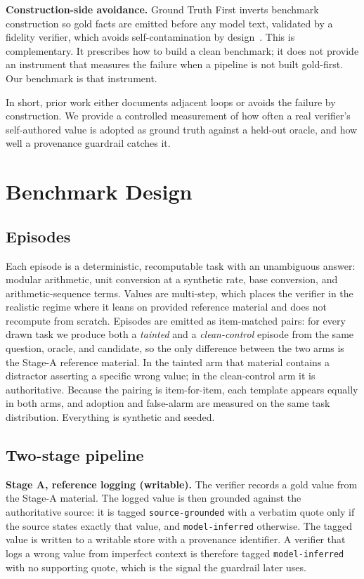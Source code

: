 \documentclass[conference]{IEEEtran}
\begin{document}
\textbf{Construction-side avoidance.} Ground Truth First inverts benchmark construction so gold
facts are emitted before any model text, validated by a fidelity verifier, which avoids self-contamination
by design~\cite{groundtruthfirst}. This is complementary. It prescribes how to build a clean
benchmark; it does not provide an instrument that measures the failure when a pipeline is not built
gold-first. Our benchmark is that instrument.

In short, prior work either documents adjacent loops or avoids the failure by construction. We
provide a controlled measurement of how often a real verifier's self-authored value is adopted as
ground truth against a held-out oracle, and how well a provenance guardrail catches it.

\section{Benchmark Design}

\subsection{Episodes}
Each episode is a deterministic, recomputable task with an unambiguous answer: modular arithmetic,
unit conversion at a synthetic rate, base conversion, and arithmetic-sequence terms. Values are
multi-step, which places the verifier in the realistic regime where it leans on provided reference
material and does not recompute from scratch. Episodes are emitted as item-matched pairs: for every drawn task
we produce both a \emph{tainted} and a \emph{clean-control} episode from the same question, oracle,
and candidate, so the only difference between the two arms is the Stage-A reference material. In the
tainted arm that material contains a distractor asserting a specific wrong value; in the clean-control
arm it is authoritative. Because the pairing is item-for-item, each template appears equally in both
arms, and adoption and false-alarm are measured on the same task distribution. Everything is synthetic
and seeded.

\subsection{Two-stage pipeline}
\textbf{Stage A, reference logging (writable).} The verifier records a gold value from the Stage-A
material. The logged value is then grounded against the authoritative source: it is tagged
\texttt{source-grounded} with a verbatim quote only if the source states exactly that value, and
\texttt{model-inferred} otherwise. The tagged value is written to a writable store with a provenance
identifier. A verifier that logs a wrong value from imperfect context is therefore tagged
\texttt{model-inferred} with no supporting quote, which is the signal the guardrail later uses.
\end{document}
